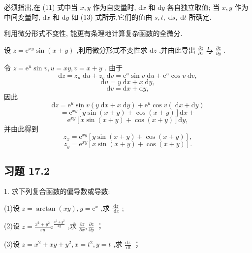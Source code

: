 必须指出,在 (11) 式中当 \(x,y\) 作为自变量时, \(\mathrm{d}x\) 和 \(\mathrm{d}y\) 各自独立取值; 当 \(x,y\) 作为中间变量时, \(\mathrm{d}x\) 和 \(\mathrm{d}y\) 如 (13) 式所示,它们的值由 \(s,t,\mathrm{\;d}s,\mathrm{\;d}t\) 所确定.

利用微分形式不变性, 能更有条理地计算复杂函数的全微分.

\begin{example}

\end{example}
设 \(z = {\mathrm{e}}^{xy}\sin \left( {x + y}\right)\) ,利用微分形式不变性求 \(\mathrm{d}z\) ,并由此导出 \(\frac{\partial z}{\partial x}\) 与 \(\frac{\partial z}{\partial y}\) .

\begin{solution}

\end{solution}
令 \(z = {\mathrm{e}}^{u}\sin v,u = {xy},v = x + y\) . 由于
\[
\mathrm{d}z = {z}_{u}\mathrm{\;d}u + {z}_{v}\mathrm{\;d}v = {\mathrm{e}}^{u}\sin v\mathrm{\;d}u + {\mathrm{e}}^{u}\cos v\mathrm{\;d}v,
\]
\[
\mathrm{d}u = y\mathrm{\;d}x + x\mathrm{\;d}y,
\]
\[
\mathrm{d}v = \mathrm{d}x + \mathrm{d}y,
\]
因此
\[
\mathrm{d}z = {\mathrm{e}}^{u}\sin v\left( {y\mathrm{\;d}x + x\mathrm{\;d}y}\right)  + {\mathrm{e}}^{u}\cos v\left( {\mathrm{\;d}x + \mathrm{d}y}\right)
\]
\[
= {\mathrm{e}}^{xy}\left\lbrack  {y\sin \left( {x + y}\right)  + \cos \left( {x + y}\right) }\right\rbrack  \mathrm{d}x +
\]
\[
{\mathrm{e}}^{xy}\left\lbrack  {x\sin \left( {x + y}\right)  + \cos \left( {x + y}\right) }\right\rbrack  \mathrm{d}y,
\]
并由此得到
\[
{z}_{x} = {\mathrm{e}}^{xy}\left\lbrack  {y\sin \left( {x + y}\right)  + \cos \left( {x + y}\right) }\right\rbrack  ,
\]
\[
{z}_{y} = {\mathrm{e}}^{xy}\left\lbrack  {x\sin \left( {x + y}\right)  + \cos \left( {x + y}\right) }\right\rbrack  .
\]
\subsection{习题 17.2}

1. 求下列复合函数的偏导数或导数:

(1)设 \(z = \arctan \left( {xy}\right) ,y = {\mathrm{e}}^{x}\) ,求 \(\frac{\mathrm{d}z}{\mathrm{\;d}x}\) ;

(2)设 \(z = \frac{{x}^{2} + {y}^{2}}{xy}{\mathrm{e}}^{\frac{{x}^{2} + {y}^{2}}{xy}}\) ,求 \(\frac{\partial z}{\partial x},\frac{\partial z}{\partial y}\) ；

(3)设 \(z = {x}^{2} + {xy} + {y}^{2},x = {t}^{2},y = t\) ,求 \(\frac{\mathrm{d}z}{\mathrm{\;d}t}\) ；

